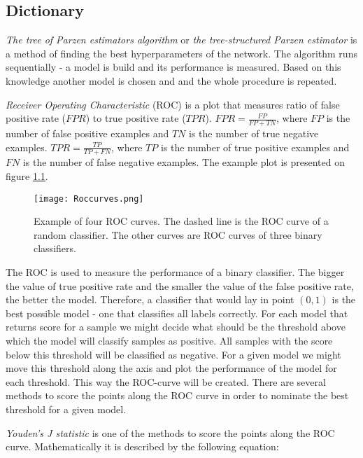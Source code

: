 \documentclass[a4paper,10pt]{report}
\begin{document}
   \begin{appendices}
    \chapter{Dictionary}\label{appendiks}
      \emph{The tree of Parzen estimators algorithm} or \emph{the tree-structured Parzen estimator} is a method of finding the best hyperparameters of the network. The algorithm runs sequentially - a model is build and its performance is measured. Based on this knowledge another model is chosen and and the whole procedure is repeated.
      
      
      \emph{Receiver Operating Characteristic} (ROC) is a plot that measures ratio of false positive rate ($FPR$) to true positive rate ($TPR$). $FPR = \frac{FP}{FP + TN}$, where $FP$ is the number of false positive examples and $TN$ is the number of true negative examples. $TPR = \frac{TP}{TP + FN}$, where $TP$ is the number of true positive examples and $FN$ is the number of false negative examples. The example plot is presented on figure \ref{fig:ROC}.
      
      \begin{figure}[h!]
	  \centering
	  \texttt{[image: Roccurves.png]}
	  \caption{Example of four ROC curves. The dashed line is the ROC curve of a random classifier. The other curves are ROC curves of three binary classifiers\cite{bibROC}.}
	  \label{fig:ROC}
      \end{figure} 
      
      The ROC is used to measure the performance of a binary classifier. The bigger the value of true positive rate and the smaller the value of the false positive rate, the better the model. Therefore, a classifier that would lay in point ${(0, 1)}$ is the best possible model - one that classifies all labels correctly. For each model that returns score for a sample we might decide  what should be the threshold above which the model will classify samples as positive. All samples with the score below this threshold will be classified as negative. For a given model we might move this threshold along the axis and plot the performance of the model for each threshold. This way the ROC-curve will be created. There are several methods to score the points along the ROC curve in order to nominate the best threshold for a given model.
      
      \emph{Youden's J statistic} is one of the methods to score the points along the ROC curve. Mathematically it is described by the following equation:
      

\end{appendices}
\end{document}
